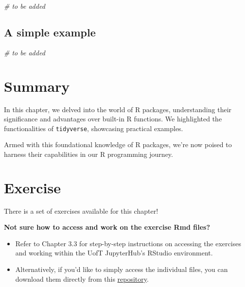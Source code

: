\documentclass[
]{book}
\newenvironment{Shaded}{\begin{snugshade}}{\end{snugshade}}
\newcommand{\CommentTok}[1]{\textcolor[rgb]{0.56,0.35,0.01}{\textit{#1}}}
\begin{document}
\begin{Shaded}
\begin{Highlighting}[]
\CommentTok{\# to be added}
\end{Highlighting}
\end{Shaded}

\hypertarget{a-simple-example}{%
\subsection{A simple example}\label{a-simple-example}}

\begin{Shaded}
\begin{Highlighting}[]
\CommentTok{\# to be added}
\end{Highlighting}
\end{Shaded}

\hypertarget{summary-4}{%
\section{Summary}\label{summary-4}}

In this chapter, we delved into the world of R packages, understanding their significance and advantages over built-in R functions. We highlighted the functionalities of \texttt{tidyverse}, showcasing practical examples.

Armed with this foundational knowledge of R packages, we're now poised to harness their capabilities in our R programming journey.

\hypertarget{exercise-4}{%
\section{Exercise}\label{exercise-4}}

There is a set of exercises available for this chapter!

\textbf{Not sure how to access and work on the exercise Rmd files? }

\begin{itemize}
\item
  Refer to Chapter 3.3 for step-by-step instructions on accessing the exercises and working within the UofT JupyterHub's RStudio environment.
\item
  Alternatively, if you'd like to simply access the individual files, you can download them directly from this \href{https://github.com/UofTChem-Teaching/R4EnvChem-Exercises}{repository}.
\end{itemize}
\end{document}
